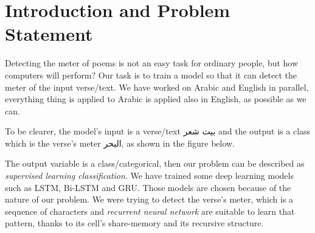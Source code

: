 \documentclass[12pt]{report}
\begin{document}






\section{Introduction and Problem Statement}
Detecting the meter of poems is not an easy task for ordinary people, but how
computers will perform? Our task is to train a model so that it can detect the
meter of the input verse/text.
We have worked on Arabic and English in parallel, everything thing is applied to
Arabic is applied also in English, as possible as we can.

To be clearer, the model's input is a verse/text \textarabic{بيت شعر} and the
output is a class which is the verse's meter \textarabic{البحر}, as shown in the
figure below.


\begin{center}
\end{center}

The output variable is a class/categorical, then our problem can be described as
\textit{supervised learning  classification}.  We have trained some deep learning
models such as LSTM, Bi-LSTM and GRU.  Those models are chosen because of the
nature of our problem. We were trying to detect the verse's meter, which is a
sequence of characters and \textit{recurrent neural network} are suitable  to
learn that pattern, thanks to its cell's share-memory and its recursive
structure.
\end{document}
